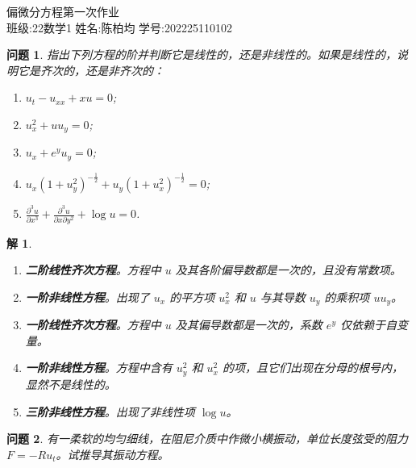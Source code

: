 \documentclass[12pt,a4paper]{article}
\newtheorem{problem}{问题}
\newtheorem*{solution}{解}
\begin{document}
	
	\begin{center}
		\LARGE 偏微分方程第一次作业 \\
		\vspace{0.5cm}
		\large 班级:22数学1 \quad 姓名:陈柏均 \quad 学号:202225110102
	\end{center}
	
	\begin{problem}
		指出下列方程的阶并判断它是线性的，还是非线性的。如果是线性的，说明它是齐次的，还是非齐次的：
		\begin{enumerate}[(1)]
			\item \( u_t - u_{xx} + xu = 0 \);
			\item \( u_x^2 + u u_y = 0 \);
			\item \( u_x + e^y u_y = 0 \);
			\item \( u_x(1+u_y^2)^{-\frac{1}{2}} + u_y(1+u_x^2)^{-\frac{1}{2}} = 0 \);
			\item \( \frac{\partial^3 u}{\partial x^3} + \frac{\partial^3 u}{\partial x \partial y^2} + \log u = 0 \).
		\end{enumerate}
	\end{problem}
	
	\begin{solution}
		\begin{enumerate}[(1)]
			\item \textbf{二阶线性齐次方程}。方程中 \(u\) 及其各阶偏导数都是一次的，且没有常数项。
			\item \textbf{一阶非线性方程}。出现了 \(u_x\) 的平方项 \(u_x^2\) 和 \(u\) 与其导数 \(u_y\) 的乘积项 \(u u_y\)。
			\item \textbf{一阶线性齐次方程}。方程中 \(u\) 及其偏导数都是一次的，系数 \(e^y\) 仅依赖于自变量。
			\item \textbf{一阶非线性方程}。方程中含有 \(u_y^2\) 和 \(u_x^2\) 的项，且它们出现在分母的根号内，显然不是线性的。
			\item \textbf{三阶非线性方程}。出现了非线性项 \(\log u\)。
		\end{enumerate}
	\end{solution}
	
	\newpage
	\begin{problem}
		有一柔软的均匀细线，在阻尼介质中作微小横振动，单位长度弦受的阻力 \(F = -Ru_t\)。试推导其振动方程。
	\end{problem}
	
\end{document}
